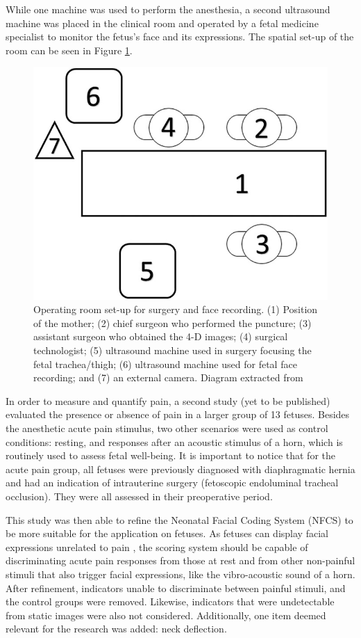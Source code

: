 While one machine was used to perform the anesthesia, a second ultrasound machine was placed in the clinical room and operated by a fetal medicine specialist to monitor the fetus’s face and its expressions. The spatial set-up of the room can be seen in Figure \ref{fig:ultrasound}.

\begin{figure}[h!tp]
    \centering
    \includegraphics[width=.35\textwidth]{imgs/chap4_ultrasound_setup.jpg}
    \caption[Operating room set-up for surgery and face recording]{Operating room set-up for surgery and face recording. (1) Position of the mother; (2) chief surgeon who performed the puncture; (3) assistant surgeon who obtained the 4-D images; (4) surgical technologist; (5) ultrasound machine used in surgery focusing the fetal trachea/thigh; (6) ultrasound machine used for fetal face recording; and (7) an external camera. Diagram extracted from \citep{bernardes2018feasibility}}
    \label{fig:ultrasound}
\end{figure}

In order to measure and quantify pain, a second study (yet to be published) evaluated the presence or absence of pain in a larger group of 13 fetuses. Besides the anesthetic acute pain stimulus, two other scenarios were used as control conditions: resting, and responses after an acoustic stimulus of a horn, which is routinely used to assess fetal well-being. It is important to notice that for the acute pain group, all fetuses were previously diagnosed with diaphragmatic hernia and had an indication of intrauterine surgery (fetoscopic endoluminal tracheal occlusion). They were all assessed in their preoperative period. 

This study was then able to refine the Neonatal Facial Coding System (NFCS) to be more suitable for the application on fetuses. As fetuses can display facial expressions unrelated to pain \citep{Reissland2011}, the scoring system should be capable of discriminating acute pain responses from those at rest and from other non-painful stimuli that also trigger facial expressions, like the vibro-acoustic sound of a horn. After refinement, indicators unable to discriminate between painful stimuli, and the control groups were removed. Likewise, indicators that were undetectable from static images were also not considered. Additionally, one item deemed relevant for the research was added: neck deflection.

